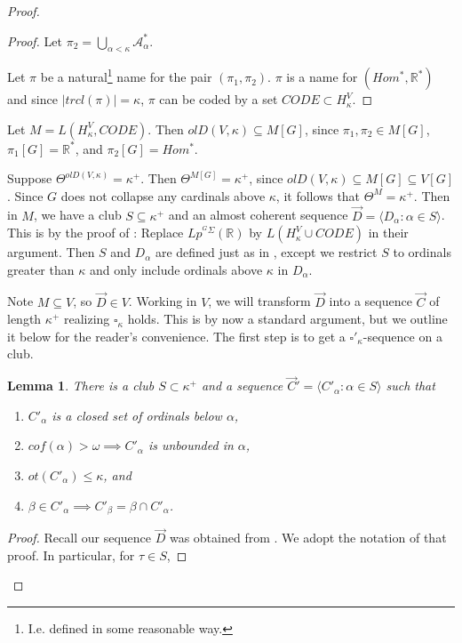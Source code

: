 \documentclass[12pt]{article}
\newtheorem{lemma}[theorem]{Lemma}
\newcommand\R{\mathbb{R}}
\begin{document}
\begin{proof}
\begin{proof}
        Let $\pi_2 = \bigcup_{\alpha < \kappa} \mathcal{A}^*_\alpha$.

        Let $\pi$ be a natural\footnote{I.e. defined in some reasonable way.} name for the pair $(\pi_1,\pi_2)$. $\pi$ is a name for $(Hom^*,\R^*)$ and since $|trcl(\pi)| = \kappa$, $\pi$ can be coded by a set $CODE \subset H^V_\kappa$.
    \end{proof}

    Let $M = L(H^V_\kappa,CODE)$. Then $olD(V,\kappa)\subseteq M[G]$, since $\pi_1,\pi_2\in M[G]$, $\pi_1[G] = \R^*$, and $\pi_2[G] = Hom^*$.

    Suppose $\Theta^{olD(V,\kappa)} = \kappa^+$. Then $\Theta^{M[G]} = \kappa^+$, since $olD(V,\kappa)\subseteq M[G] \subseteq V[G]$. Since $G$ does not collapse any cardinals above $\kappa$, it follows that $\Theta^M = \kappa^+$. Then in $M$, we have a club $S\subseteq \kappa^+$ and an almost coherent sequence $\vec{D} = \langle D_\alpha : \alpha \in S\rangle$. This is by the proof of \cite{coherent}: Replace $Lp^{^G\Sigma}(\R)$ by $L(H^V_\kappa \cup CODE)$ in their argument. Then $S$ and $D_\alpha$ are defined just as in \cite{coherent}, except we restrict $S$ to ordinals greater than $\kappa$ and only include ordinals above $\kappa$ in $D_\alpha$.
    
    Note $M\subseteq V$, so $\vec{D}\in V$. Working in $V$, we will transform $\vec{D}$ into a sequence $\vec{C}$ of length $\kappa^+$ realizing $\square_\kappa$ holds. This is by now a standard argument, but we outline it below for the reader's convenience. The first step is to get a $\square'_\kappa$-sequence on a club.
    
    \begin{lemma}
    \label{square' from old derived model}
        There is a club $S\subset \kappa^+$ and a sequence $\vec{C}' = \langle C'_\alpha : \alpha \in S \rangle$ such that
        \begin{enumerate}
            \item $C'_\alpha$ is a closed set of ordinals below $\alpha$, 
            \item $cof(\alpha)>\omega \implies C'_\alpha$ is unbounded in $\alpha$,
            \item $ot(C'_\alpha)\leq \kappa$, and
            \item $\beta \in C'_\alpha \implies C'_\beta = \beta \cap C'_\alpha$.
        \end{enumerate}
    \end{lemma}
    \begin{proof}
        Recall our sequence $\vec{D}$ was obtained from \cite{coherent}. We adopt the notation of that proof. In particular, for $\tau\in S$,


\end{proof}
\end{proof}
\end{document}
